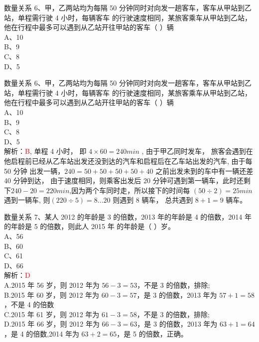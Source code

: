 \documentclass[aspectratio=169]{beamer}
\begin{document}
\begin{frame}[t]{数量关系}
    6、甲，乙两站均为每隔 50 分钟同时对向发一趟客车，客车从甲站到乙站，单程需行驶 4 小时，每辆客车
的行驶速度相同，某旅客乘车从甲站到乙站，他在行程中最多可以遇到从乙站开往甲站的客车（ ）辆\\
A、10\\
B、9\\
C、8\\
D、5\\
\end{frame}


\begin{frame}[t]{数量关系}
    6、甲，乙两站均为每隔 50 分钟同时对向发一趟客车，客车从甲站到乙站，单程需行驶 4 小时，每辆客车
的行驶速度相同，某旅客乘车从甲站到乙站，他在行程中最多可以遇到从乙站开往甲站的客车（ ）辆\\
A、10\\
B、9\\
C、8\\
D、5\\
    解析：\textcolor{red}{B},
    单程 4 小时， 即 $4 \times 60 = 240min$ ,
    由于甲乙同时发车， 旅客会遇到在他启程前已经从乙车站出发还没到达的汽车和启程后在乙车站出发的汽车,
    由于每 50 分钟 出发一辆，$240=50+50+50+50+40$ 之前出发未到的车中有一辆还差 40 分钟到达，
    由于速度相同，则乘客出发后 20 分钟可遇到第一辆车，此时还剩下$240-20=220 min$,因为两个车同时走，所以接下的时间每 $(50 \div 2) = 25 min$ 遇到一辆车,
    则$(220 \div 5 ) = 8...20$ 则遇到 8 辆车， 总共遇到 $8+1=9$ 辆车。

\end{frame}



\begin{frame}[t]{数量关系}
    7、某人 2012 的年龄是 3 的倍数，2013 年的年龄是 4 的倍数，2014 年的年龄是 5 的倍数，则此人 2015 年
的年龄是（ ）岁。\\
A、56\\
B、60\\
C、61\\
D、66\\
    解析：\textcolor{red}{D}\\
    A.2015 年 56 岁，则 2012 年为 $56-3 = 53$，不是 3 的倍数，排除;\\
    B.2015 年 60 岁，则 2012 年为 $60-3 = 57$，是 3 的倍数，2013 年为 $57+1 = 58$，不是 4 的倍数\\
    C.2015 年 61 岁，则 2012 年为 $61-3 = 58$，不是 3 的倍数，排除;\\
    D.2015 年 66 岁，则 2012 年为 $66-3 = 63$，是 3 的倍数，2013 年为 $63+1 = 64$，是 4 的倍数,2014
年为 $63+2 = 65$，是 5 的倍数，正确。\\
\end{frame}
\end{document}
